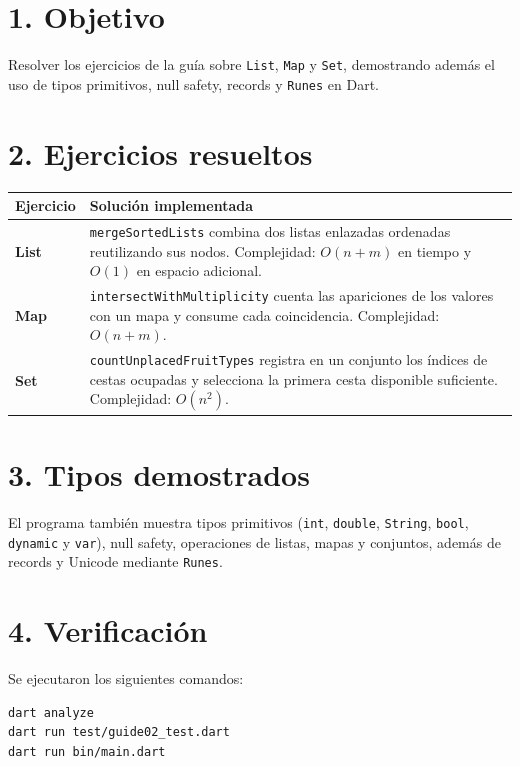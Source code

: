 \documentclass[11pt,a4paper]{article}
\begin{document}

\section*{1. Objetivo}

Resolver los ejercicios de la guía sobre \texttt{List}, \texttt{Map} y
\texttt{Set}, demostrando además el uso de tipos primitivos, null safety,
records y \texttt{Runes} en Dart.

\section*{2. Ejercicios resueltos}

\begin{tabularx}{\textwidth}{>{\bfseries}p{2.7cm}X}
\toprule
Ejercicio & Solución implementada \\
\midrule
List & \texttt{mergeSortedLists} combina dos listas enlazadas ordenadas
reutilizando sus nodos. Complejidad: $O(n+m)$ en tiempo y $O(1)$ en espacio adicional. \\
Map & \texttt{intersectWithMultiplicity} cuenta las apariciones de los valores
con un mapa y consume cada coincidencia. Complejidad: $O(n+m)$. \\
Set & \texttt{countUnplacedFruitTypes} registra en un conjunto los índices de
cestas ocupadas y selecciona la primera cesta disponible suficiente. Complejidad: $O(n^2)$. \\
\bottomrule
\end{tabularx}

\section*{3. Tipos demostrados}

El programa también muestra tipos primitivos (\texttt{int}, \texttt{double},
\texttt{String}, \texttt{bool}, \texttt{dynamic} y \texttt{var}), null safety,
operaciones de listas, mapas y conjuntos, además de records y Unicode mediante
\texttt{Runes}.

\section*{4. Verificación}

Se ejecutaron los siguientes comandos:

\begin{verbatim}
dart analyze
dart run test/guide02_test.dart
dart run bin/main.dart
\end{verbatim}
\end{document}
